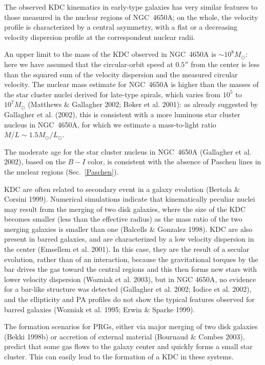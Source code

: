 \documentclass[12pt,preprint]{aastex}
\begin{document}
The observed KDC kinematics in early-type galaxies has very similar
features to those measured in the nuclear regions of NGC~4650A; on the
whole, the velocity profile is characterized by a central asymmetry,
with a flat or a decreasing velocity dispersion profile at the
correspondent nuclear radii.

An upper limit to the mass of the KDC observed in NGC~4650A is $\sim
10^8 M_{\odot}$: here we have assumed that the circular-orbit speed at
$0.5''$ from the center is less than the squared sum of the velocity
dispersion and the measured circular velocity. The nuclear mass
estimate for NGC~4650A is higher than the masses of the star cluster
nuclei derived for late-type spirals, which varies from $10^5$ to
$10^7 M_{\odot}$ (Matthews \& Gallagher 2002; B$\ddot{o}$ker et
al. 2001): as already suggested by Gallagher et al. (2002), this is
consistent with a more luminous star cluster nucleus in NGC~4650A, for
which we estimate a mass-to-light ratio $M/L \sim 1.5
M_{\odot}/L_{\odot}$.

The moderate age for the star cluster nucleus in NGC~4650A (Gallagher
et al. 2002), based on the $B - I$ color, is consistent with the
absence of Paschen lines in the nuclear regions (Sec.~\ref{Paschen}).

KDC are often related to secondary event in a galaxy evolution
(Bertola \& Corsini 1999). Numerical simulations indicate
that kinematically peculiar nuclei may result from the merging of two
disk galaxies, where the size of the KDC becomes smaller (less than
the effective radius) as the mass ratio of the two merging galaxies is
smaller than one (Balcells \& Gonzalez 1998). KDC are also present in
barred galaxies, and are characterized by a low velocity dispersion in
the center (Emsellem et al. 2001). In this case, they are the result
of a secular evolution, rather than of an interaction, because the
gravitational torques by the bar drives the gas toward the central
regions and this then forms new stars with lower velocity dispersion
(Wozniak et al. 2003), but in NGC 4650A, no evidence for a bar-like
structure was detected (Gallagher et al. 2002; Iodice et al. 2002),
and the ellipticity and PA profiles do not show the typical features
observed for barred galaxies (Wozniak et al. 1995; Erwin \& Sparke
1999).

The formation scenarios for PRGs, either via major merging of two disk
galaxies (Bekki 1998b) or accretion of external material (Bournaud \&
Combes 2003), predict that some gas flows to the galaxy center and
quickly forms a small star cluster. This can easily lead to the
formation of a KDC in these systems.
\end{document}
